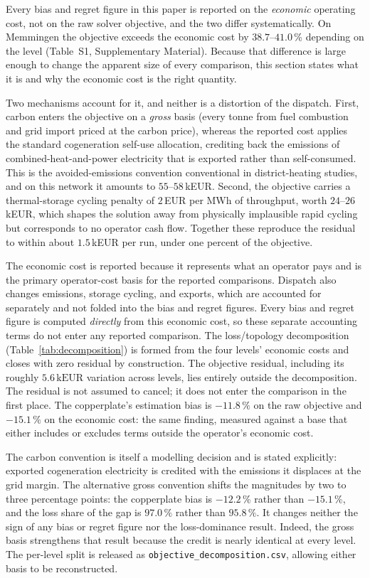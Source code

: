 \documentclass[a4paper,fleqn]{cas-sc}
\begin{document}
Every bias and regret figure in this paper is reported on the \emph{economic} operating
cost, not on the raw solver objective, and the two differ systematically. On Memmingen the
objective exceeds the economic cost by $38.7$--$41.0$\,\% depending on the level
(Table~S1, Supplementary Material). Because that difference is large enough to change the
apparent size of every comparison, this section states what it is and why the economic cost is the
right quantity.

Two mechanisms account for it, and neither is a distortion of the dispatch. First, carbon
enters the objective on a \emph{gross} basis (every tonne from fuel combustion and grid
import priced at the carbon price), whereas the reported cost applies the standard
cogeneration self-use allocation, crediting back the emissions of combined-heat-and-power
electricity that is exported rather than self-consumed. This is the avoided-emissions
convention conventional in district-heating studies, and on this network it amounts to
$55$--$58$\,kEUR. Second, the objective carries a thermal-storage cycling penalty of
$2$\,EUR per MWh of throughput, worth $24$--$26$\,kEUR, which shapes the solution away from
physically implausible rapid cycling but corresponds to no operator cash flow. Together
these reproduce the residual to within about $1.5$\,kEUR per run, under one percent of the
objective.

The economic cost is reported because it represents what an operator pays and is the primary
operator-cost basis for the reported comparisons. Dispatch also changes emissions, storage
cycling, and exports, which are accounted for separately and not folded into the bias and regret
figures. Every bias and regret figure is computed \emph{directly} from this economic cost, so
these separate accounting terms do not enter any reported comparison. The loss/topology
decomposition (Table~\ref{tab:decomposition}) is formed from the four levels' economic costs and
closes with zero residual by construction. The objective residual, including its roughly
\(5.6\,\mathrm{kEUR}\) variation across levels, lies entirely outside the decomposition. The
residual is not assumed to cancel; it does not enter the comparison in the first place. The
copperplate's estimation bias is \(-11.8\,\%\) on the raw objective and
\(\mathbf{-15.1}\,\%\) on the economic cost: the same finding, measured against a base that
either includes or excludes terms outside the operator's economic cost.

The carbon convention is itself a modelling decision and is stated explicitly: exported
cogeneration electricity is credited with the emissions it displaces at the grid margin. The
alternative gross convention shifts the magnitudes by two to three percentage points: the
copperplate bias is \(-12.2\,\%\) rather than \(-15.1\,\%\), and the loss share of the gap is
\(97.0\,\%\) rather than \(95.8\,\%\). It changes neither the sign of any bias or regret figure
nor the loss-dominance result. Indeed, the gross basis strengthens that result because the
credit is nearly identical at every level. The per-level split is released as
\texttt{objective\_decomposition.csv}, allowing either basis to be reconstructed.
\end{document}
